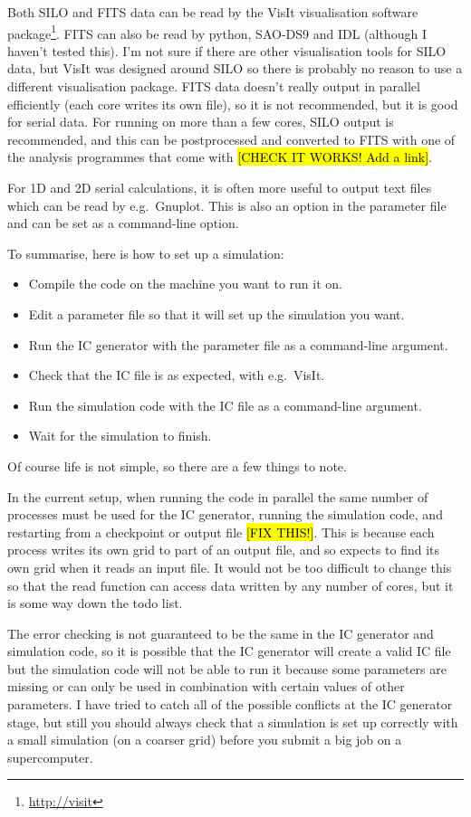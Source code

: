 \documentclass[a4paper,11pt]{report}
\begin{document}
Both SILO and FITS data can be read by the VisIt visualisation software package\footnote{\url{http://visit}}.
FITS can also be read by python, SAO-DS9 and IDL (although I haven't tested this).
I'm not sure if there are other visualisation tools for SILO data, but VisIt was designed around SILO so there is probably no reason to use a different visualisation package.
FITS data doesn't really output in parallel efficiently (each core writes its own file), so it is not recommended, but it is good for serial data.
For running on more than a few cores, SILO output is recommended, and this can be postprocessed and converted to FITS with one of the analysis programmes that come with \pion{} \hl{[CHECK IT WORKS!  Add a link]}.

For 1D and 2D serial calculations, it is often more useful to output text files which can be read by e.g.\ Gnuplot.
This is also an option in the parameter file and can be set as a command-line option.

To summarise, here is how to set up a simulation:
\begin{itemize}
\item Compile the code on the machine you want to run it on.
\item Edit a parameter file so that it will set up the simulation you want.
\item Run the IC generator with the parameter file as a command-line argument.
\item Check that the IC file is as expected, with e.g.\ VisIt.
\item Run the simulation code with the IC file as a command-line argument.
\item Wait for the simulation to finish.
\end{itemize}

Of course life is not simple, so there are a few things to note.

In the current setup, when running the code in parallel the same number of processes must be used for the IC generator, running the simulation code, and restarting from a checkpoint or output file \hl{[FIX THIS!]}.
This is because each process writes its own grid to part of an output file, and so expects to find its own grid when it reads an input file.
It would not be too difficult to change this so that the read function can access data written by any number of cores, but it is some way down the todo list.

The error checking is not guaranteed to be the same in the IC generator and simulation code, so it is possible that the IC generator will create a valid IC file but the simulation code will not be able to run it because some parameters are missing or can only be used in combination with certain values of other parameters.
I have tried to catch all of the possible conflicts at the IC generator stage, but still you should always check that a simulation is set up correctly with a small simulation (on a coarser grid) before you submit a big job on a supercomputer.
\end{document}
